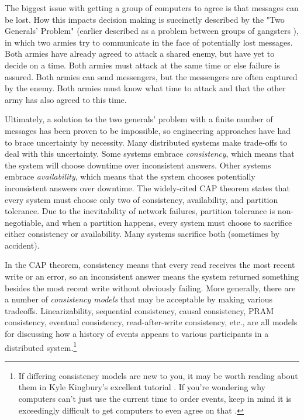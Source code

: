 \documentclass[a4paper,10pt]{article} \usepackage[utf8]{inputenc}
\begin{document}
The biggest issue with getting a group of computers to agree is that messages
can be lost. How this impacts decision making is succinctly described by the
"Two Generals' Problem" \cite{two-generals} (earlier described as a problem
between groups of gangsters \cite{two-gangsters}), in which two armies try to
communicate in the face of potentially lost messages. Both armies have already
agreed to attack a shared enemy, but have yet to decide on a time. Both armies
must attack at the same time or else failure is assured. Both armies can send
messengers, but the messengers are often captured by the enemy. Both armies must
know what time to attack and that the other army has also agreed to this time.

Ultimately, a solution to the two generals' problem with a finite number of
messages has been proven to be impossible, so engineering approaches have had
to brace uncertainty by necessity. Many distributed systems make trade-offs to
deal with this uncertainty. Some systems embrace {\em consistency}, which means
that the system will choose downtime over inconsistent answers. Other
systems embrace {\em availability}, which means that the system chooses
potentially inconsistent answers over downtime. The widely-cited CAP
theorem \cite{cap} states that every system must choose only two of consistency,
availability, and partition tolerance. Due to the inevitability of network
failures, partition tolerance is non-negotiable, and when a partition happens,
every system must choose to sacrifice either consistency or availability. Many
systems sacrifice both (sometimes by accident).

In the CAP theorem, consistency means that every read receives the most recent
write or an error, so an inconsistent answer means the system returned something
besides the most recent write without obviously failing. More generally, there
are a number of {\em consistency models} that may be acceptable by making
various tradeoffs. Linearizability, sequential consistency, causal consistency,
PRAM consistency, eventual consistency, read-after-write consistency, etc., are
all models for discussing how a history of events appears to various
participants in a distributed system.\footnote{If differing consistency models
are new to you, it may be worth reading about them in Kyle Kingbury's excellent
tutorial \cite{aphyr-consistency}. If you're wondering why computers can't just
use the current time to order events, keep in mind it is exceedingly difficult
to get computers to even agree on that \cite{no-now}.}
\end{document}
